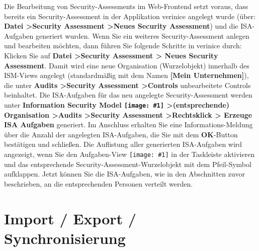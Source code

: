 \documentclass[a4paper,10pt]{book}
\newcommand{\icon}[1]{\texttt{[image: \#1]}}
\begin{document}
Die Bearbeitung von Security-Assessments im Web-Frontend setzt voraus, dass bereits ein Security-Assessment in der Applikation verinice angelegt wurde
(über: \textbf{Datei \textgreater Security Assessment \textgreater Neues Security Assessment}) und die ISA-Aufgaben generiert wurden. Wenn Sie ein weiteres Security-Assessment
anlegen und bearbeiten möchten, dann führen Sie folgende Schritte in verinice durch: Klicken Sie auf \textbf{Datei \textgreater Security Assessment \textgreater
Neues Security Assessment}. Damit wird eine neue Organisation (Wurzelobjekt) innerhalb des ISM-Views angelegt (standardmäßig mit dem Namen
\textbf{[Mein Unternehmen]}), die unter \textbf{Audits \textgreater Security Assessment \textgreater Controls} unbearbeitete Controls beinhaltet.
Die ISA-Aufgaben für das neu angelegte Security-Assessment werden unter \textbf{Information Security Model
\icon{Icon/Informationssicherheitsmodell.png} \textgreater (entsprechende) Organisation \textgreater Audits \textgreater Security Assessment \textgreater Rechtsklick \textgreater
Erzeuge ISA Aufgaben} generiert. Im Anschluss erhalten Sie eine Informations-Meldung über die
Anzahl der angelegten ISA-Aufgaben, die Sie mit dem \textbf{OK}-Button bestätigen und schließen.
Die Auflistung aller generierten ISA-Aufgaben wird angezeigt, wenn Sie den Aufgaben-View
\icon{Icon/Tasks.png} in der Taskleiste aktivieren und das entsprechende Security-Assessment-Wurzelobjekt mit
dem Pfeil-Symbol aufklappen. Jetzt können Sie die ISA-Aufgaben, wie in den Abschnitten zuvor beschrieben, an die entsprechenden Personen verteilt werden.

\chapter{Import / Export / Synchronisierung}
\end{document}
